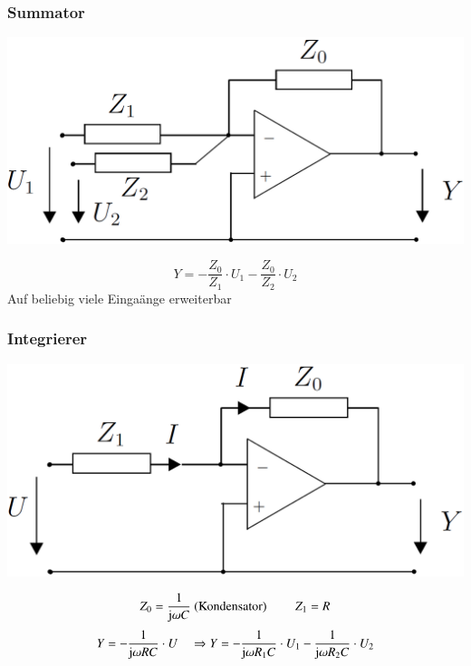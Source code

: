 \subsubsection{Summator}

\begin{minipage}[c]{0.35\columnwidth}
    \includegraphics[width=\columnwidth]{images/opamp_grundschaltung_2_eingaenge.png}
\end{minipage}
\hfill
\begin{minipage}[c]{0.62\columnwidth}
    $$ Y = - \frac{Z_0}{Z_1} \cdot U_1 - \frac{Z_0}{Z_2} \cdot U_2 $$
    \textrightarrow Auf beliebig viele Eingaänge erweiterbar
\end{minipage}


\subsubsection{Integrierer}

\begin{minipage}[c]{0.35\columnwidth}
    \includegraphics[width=\columnwidth]{images/opamp_grundschaltung_1_eingang.png}
\end{minipage}
\hfill
\begin{minipage}[c]{0.62\columnwidth}
    $$ Z_0 = \frac{1}{\mathrm{j} \omega C} \text{ (Kondensator) } \qquad  Z_1 = R $$
    $$ Y = - \frac{1}{\mathrm{j} \omega R C} \cdot U \quad \Rightarrow Y =  - \frac{1}{\mathrm{j} \omega R_1 C} \cdot U_1 - \frac{1}{\mathrm{j} \omega R_2 C} \cdot U_2 $$
\end{minipage}          

